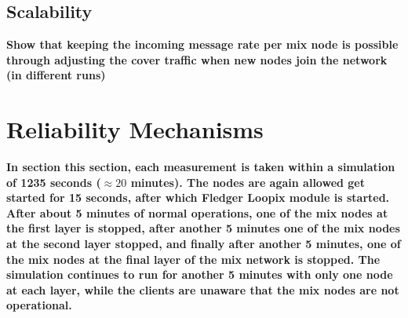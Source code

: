 \documentclass[a4paper,11pt,oneside]{report}
\begin{document}

\subsection{Scalability}
\textbf{Show that keeping the incoming message rate per mix node is possible through adjusting the cover traffic when new nodes join the network (in different runs)}


\section{Reliability Mechanisms}
\textbf{In section this section, each measurement is taken within a simulation of 1235 seconds  (\(\approx 20\) minutes). The nodes are again allowed get started for 15 seconds, after which Fledger Loopix module is started. After about 5 minutes of normal operations, one of the mix nodes at the first layer is stopped, after another 5 minutes one of the mix nodes at the second layer stopped, and finally after another 5 minutes, one of the mix nodes at the final layer of the mix network is stopped. The simulation continues to run for another 5 minutes with only one node at each layer, while the clients are unaware that the mix nodes are not operational.}
\end{document}
